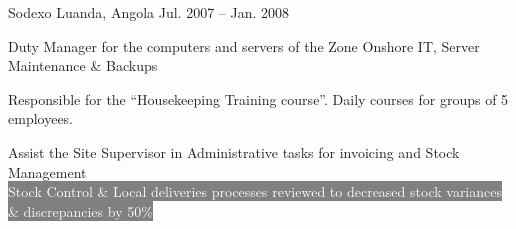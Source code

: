 \begin{cventries}

{Sodexo} %
{Luanda, Angola} %
{Jul. 2007 – Jan. 2008} %
{\begin{cvitems}
\item {Duty Manager for the computers and servers of the Zone Onshore IT, Server Maintenance \& Backups}
\item {Responsible for the “Housekeeping Training course”. Daily courses for groups of 5 employees.}
\item {Assist the Site Supervisor in Administrative tasks for invoicing and Stock Management}
\\
\center\colorbox{gray}{\textcolor{white}{Stock Control \& Local deliveries processes reviewed to decreased stock variances \& discrepancies by 50\%}}
\end{cvitems}
}


\end{cventries}
